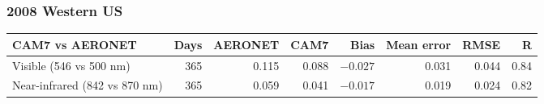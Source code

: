 \begin{frame}[t]
\frametitle{2008 Western US}
\centering
{}\hfill
{}\par
\vspace{0.15cm}
\hfill
{}\par
\vspace{0.1cm}
{\tiny\setlength{\tabcolsep}{5pt}
\begin{tabular}{@{}lrrrrrrr@{}}
\toprule
CAM7 vs AERONET & Days & AERONET & CAM7 & Bias & Mean error & RMSE & R \\
\midrule
Visible (546 vs 500 nm) & 365 & 0.115 & 0.088 & $-0.027$ & 0.031 & 0.044 & 0.84 \\
Near-infrared (842 vs 870 nm) & 365 & 0.059 & 0.041 & $-0.017$ & 0.019 & 0.024 & 0.82 \\
\bottomrule
\end{tabular}\par}
\end{frame}
